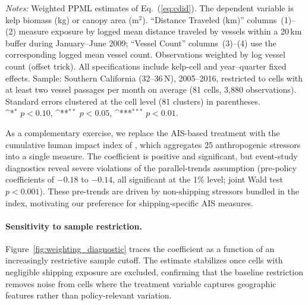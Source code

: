 \documentclass[12pt]{article}
\providecommand{\sym}[1]{\ifmmode^{#1}\else\(^{#1}\)\fi}
\begin{document}
\begin{table}[H]
  \centering
  \caption{Weighted PPML: Kelp outcomes and the 2009 ECA}
  \label{tab:weighted_2009}
  
  \vspace{0.5em}

  \begin{minipage}{\linewidth}
  \footnotesize
  \textit{Notes:} Weighted PPML estimates of Eq.~(\ref{eq:cdid}). The dependent variable is kelp biomass (kg) or canopy area (m$^{2}$). ``Distance Traveled (km)'' columns~(1)--(2) measure exposure by logged mean distance traveled by vessels within a 20\,km buffer during January--June 2009; ``Vessel Count'' columns~(3)--(4) use the corresponding logged mean vessel count. Observations weighted by log vessel count (offset trick). All specifications include kelp-cell and year--quarter fixed effects. Sample: Southern California (32\textdegree--36\textdegree\,N), 2005--2016, restricted to cells with at least two vessel passages per month on average (81 cells, 3,880 observations). Standard errors clustered at the cell level (81 clusters) in parentheses.\\
  \sym{*} \(p<0.10\), \sym{**} \(p<0.05\), \sym{***} \(p<0.01\).
  \end{minipage}
\end{table}

As a complementary exercise, we replace the AIS-based treatment with the cumulative human impact index of \citet{Halpern2009}, which aggregates 25 anthropogenic stressors into a single measure. The coefficient is positive and significant, but event-study diagnostics reveal severe violations of the parallel-trends assumption (pre-policy coefficients of $-0.18$ to $-0.14$, all significant at the 1\% level; joint Wald test $p<0.001$). These pre-trends are driven by non-shipping stressors bundled in the index, motivating our preference for shipping-specific AIS measures.

\paragraph{Sensitivity to sample restriction.} Figure~\ref{fig:weighting_diagnostic} traces the coefficient as a function of an increasingly restrictive sample cutoff. The estimate stabilizes once cells with negligible shipping exposure are excluded, confirming that the baseline restriction removes noise from cells where the treatment variable captures geographic features rather than policy-relevant variation.
\end{document}
